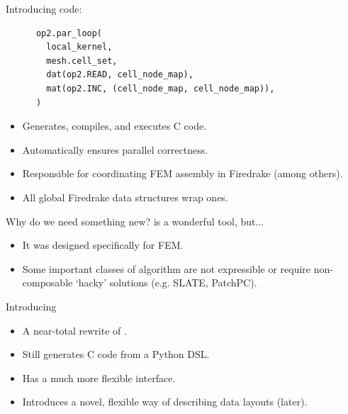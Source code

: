 \documentclass[aspectratio=169]{beamer}
\begin{document}
\begin{frame}[fragile]{Introducing }
   code:
  \begin{center}
    \begin{verbatim}
      op2.par_loop(
        local_kernel,
        mesh.cell_set,
        dat(op2.READ, cell_node_map),
        mat(op2.INC, (cell_node_map, cell_node_map)),
      )
    \end{verbatim}
  \end{center}

  \vspace{-1em}

  \begin{itemize}
    \item Generates, compiles, and executes C code.
    \item Automatically ensures parallel correctness.
    \item Responsible for coordinating FEM assembly in Firedrake (among others).
    \item All global Firedrake data structures wrap  ones.
  \end{itemize}
\end{frame}

\begin{frame}{Why do we need something new?}
   is a wonderful tool, but...

  \begin{itemize}
    \item
      It was designed specifically for FEM.
    \item
      Some important classes of algorithm are not expressible or require non-composable `hacky' solutions (e.g. SLATE, PatchPC).
  \end{itemize}
\end{frame}

\begin{frame}{Introducing }
  \begin{itemize}
    \item A near-total rewrite of .
    \item Still generates C code from a Python DSL.
    \item Has a much more flexible interface.
    \item Introduces a novel, flexible way of describing data layouts (later).
  \end{itemize}
\end{frame}
\end{document}
